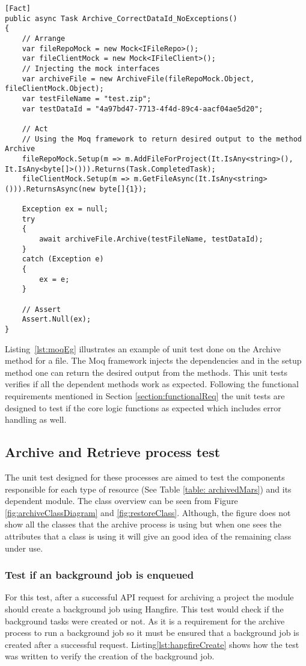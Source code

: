 \begin{lstlisting}[language={[Sharp]C}, caption={Example of faking objects using Moq framework}, captionpos=b,label={lst:moqEg}]
[Fact]
public async Task Archive_CorrectDataId_NoExceptions()
{
    // Arrange
    var fileRepoMock = new Mock<IFileRepo>();
    var fileClientMock = new Mock<IFileClient>();
    // Injecting the mock interfaces 
    var archiveFile = new ArchiveFile(fileRepoMock.Object, fileClientMock.Object);
    var testFileName = "test.zip";
    var testDataId = "4a97bd47-7713-4f4d-89c4-aacf04ae5d20";
    
    // Act
    // Using the Moq framework to return desired output to the method Archive
    fileRepoMock.Setup(m => m.AddFileForProject(It.IsAny<string>(), It.IsAny<byte[]>())).Returns(Task.CompletedTask);
    fileClientMock.Setup(m => m.GetFileAsync(It.IsAny<string>())).ReturnsAsync(new byte[]{1});

    Exception ex = null;
    try
    {
        await archiveFile.Archive(testFileName, testDataId);
    }
    catch (Exception e)
    {
        ex = e;
    }
    
    // Assert
    Assert.Null(ex);
}
\end{lstlisting}

Listing~\ref{lst:moqEg} illustrates an example of unit test done on the Archive method for a file. The Moq framework injects the dependencies and in the setup method
one can return the desired output from the methods. This unit tests verifies if all the dependent methods work as expected.
Following the functional requirements mentioned in Section \ref{section:functionalReq} the unit tests are designed to test if the core logic functions as expected which includes error handling as well.

\subsection{Archive and Retrieve process test}
The unit test designed for these processes are aimed to test the components responsible for each type of resource (See Table \ref{table: archivedMars}) and its 
dependent module. The class overview can be seen from Figure \ref{fig:archiveClassDiagram} and \ref{fig:restoreClass}. Although, the figure does not show all the classes that the archive process is using
but when one sees the attributes that a class is using it will give an good idea of the remaining class under use.

\subsubsection{Test if an background job is enqueued}
For this test, after a successful API request for archiving a project the module should create a background job using Hangfire. This test would check if the
background tasks were created or not. As it is a requirement for the archive process to run a background job so it must be ensured that a background job is created 
after a successful request. Listing\ref{lst:hangfireCreate} shows how the test was written to verify the creation of the background job.

